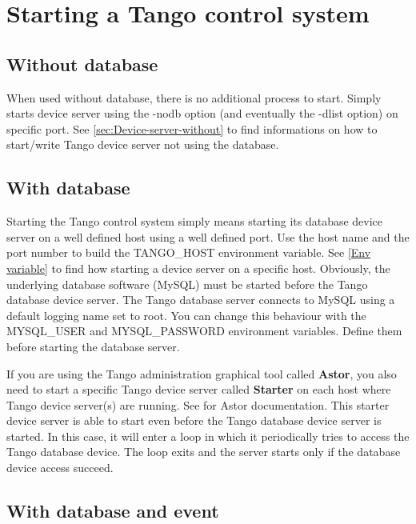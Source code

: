 
\chapter{Starting a Tango control system}


\section{Without database}

When used without database, there is no additional
process to start. Simply starts device server using the -nodb option
(and eventually the -dlist option) on specific port. See \ref{sec:Device-server-without}
to find informations on how to start/write Tango device server not
using the database.


\section{With database}

Starting the Tango control system simply means starting its database
device server on a well defined host using a well defined port. Use
the host name and the port number to build the TANGO\_HOST environment
variable. See \ref{Env variable} to find how starting a device server
on a specific host. Obviously, the underlying database software (MySQL)
must be started before the Tango database device server. The Tango
database server connects to MySQL using a default logging name set
to \textquotedbl{}root\textquotedbl{}. You can change this behaviour
with the MYSQL\_USER and MYSQL\_PASSWORD
environment variables. Define them before starting the database server.

If you are using the Tango administration graphical tool called \textbf{Astor},
you also need to start a specific Tango device server called \textbf{Starter}
on each host where Tango device server(s) are running. See \cite{Astor_doc}
for Astor documentation. This starter device server is able to start
even before the Tango database device server is started. In this case,
it will enter a loop in which it periodically tries to access the
Tango database device. The loop exits and the server starts only if
the database device access succeed.


\section{With database and event}


